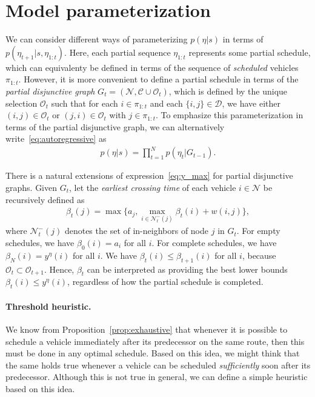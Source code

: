 \documentclass[a4paper]{report}
\theoremstyle{definition}
\theoremstyle{plain}
\begin{document}
\section{Model parameterization}

We can consider different ways of parameterizing $p(\eta | s)$ in terms of
$p(\eta_{t+1} | s, \eta_{1:t})$. Here, each partial sequence $\eta_{1:t}$
represents some partial schedule, which can equivalenty be defined in terms of
the sequence of \textit{scheduled} vehicles $\pi_{1:t}$. However, it is more
convenient to define a partial schedule in terms of the \textit{partial
  disjunctive graph} $G_{t} = (\mathcal{N}, \mathcal{C} \cup \mathcal{O}_{t})$,
which is defined by the unique selection $\mathcal{O}_{t}$ such that for each
$i \in \pi_{1:t}$ and each $\{i, j\} \in \mathcal{D}$, we have either
$(i, j) \in \mathcal{O}_{t}$ or $(j, i) \in \mathcal{O}_{t}$ with
$j \in \pi_{1:t}$.
%
To emphasize this parameterization in terms of the partial disjunctive graph, we
can alternatively write~\eqref{eq:autoregressive} as
\begin{align*}
  p(\eta | s) = \prod_{t=1}^{N} p(\eta_{t} | G_{t-1}) .
\end{align*}

There is a natural extensions of expression~\eqref{eq:y_max} for partial
disjunctive graphs. Given $G_{t}$, let the \textit{earliest crossing time} of
each vehicle $i \in \mathcal{N}$ be recursively defined as
\begin{align*}
  \beta_{t}(j) = \max\{ a_{j}, \max_{i \in \mathcal{N}^{-}_{t}(j)} \beta_{t}(i) + w(i,j) \} ,
\end{align*}
where $\mathcal{N}^{-}_{t}(j)$ denotes the set of in-neighbors of node $j$ in
$G_{t}$.
%
For empty schedules, we have $\beta_{0}(i) = a_{i}$ for all $i$. For complete
schedules, we have $\beta_{N}(i) = y^{\eta}(i)$ for all $i$. We have
$\beta_{t}(i) \leq \beta_{t+1}(i)$ for all $i$, because
$\mathcal{O}_{t} \subset \mathcal{O}_{t+1}$. Hence, $\beta_{t}$ can be
interpreted as providing the best lower bounds $\beta_{t}(i) \leq y^{\eta}(i)$,
regardless of how the partial schedule is completed.

\paragraph{Threshold heuristic.}

We know from Proposition~\ref{prop:exhaustive} that whenever it is possible to schedule a vehicle
immediately after its predecessor on the same route, then this must be done in
any optimal schedule.
%
Based on this idea, we might think that the same holds true whenever a vehicle
can be scheduled \textit{sufficiently} soon after its predecessor. Although this is not
true in general, we can define a simple heuristic based on this idea.
\end{document}
